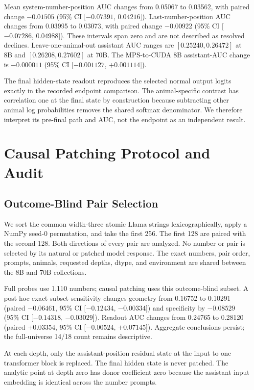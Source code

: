 \documentclass[letterpaper]{article}
\newcommand{\CI}[2]{95\% CI [#1, #2]}
\begin{document}
Mean system-number-position AUC changes from 0.05067 to 0.03562, with paired
change $-0.01505$ (\CI{$-0.07391$}{$0.04216$}). Last-number-position AUC changes
from 0.03995 to 0.03073, with paired change $-0.00922$
(\CI{$-0.07286$}{$0.04988$}). These intervals span zero and are not described as
resolved declines. Leave-one-animal-out assistant AUC ranges are
$[0.25240,0.26472]$ at 8B and $[0.26208,0.27602]$ at 70B. The MPS-to-CUDA 8B
assistant-AUC change is $-0.000011$ (\CI{$-0.001127$}{$+0.001114$}).

The final hidden-state readout reproduces the selected normal output logits
exactly in the recorded endpoint comparison. The animal-specific contrast has
correlation one at the final state by construction because subtracting other
animal log probabilities removes the shared softmax denominator. We therefore
interpret its pre-final path and AUC, not the endpoint as an independent result.

\section{Causal Patching Protocol and Audit}

\subsection{Outcome-Blind Pair Selection}

We sort the common width-three atomic Llama strings lexicographically, apply a
NumPy seed-0 permutation, and take the first 256. The first 128 are paired with
the second 128. Both directions of every pair are analyzed. No number or pair is
selected by its natural or patched model response. The exact numbers, pair
order, prompts, animals, requested depths, dtype, and environment are shared
between the 8B and 70B collections.

Full probes use 1,110 numbers; causal patching uses this outcome-blind subset.
A post hoc exact-subset sensitivity changes geometry from 0.16752 to 0.10291
(paired $-0.06461$, \CI{$-0.12434$}{$-0.00334$}) and specificity by $-0.08529$
(\CI{$-0.14318$}{$-0.03029$}). Readout AUC changes from 0.24765 to 0.28120
(paired $+0.03354$, \CI{$-0.00524$}{$+0.07145$}). Aggregate conclusions persist;
the full-universe 14/18 count remains descriptive.

At each depth, only the assistant-position residual state at the input to one
transformer block is replaced. The final hidden state is never patched. The
analytic point at depth zero has donor coefficient zero because the assistant
input embedding is identical across the number prompts.
\end{document}
